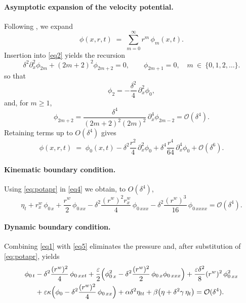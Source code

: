 \documentclass[alpha-refs, 12pt]{wiley-article}
\renewcommand{\O}{\mathcal{O}}
\begin{document}
\paragraph{Asymptotic expansion of the velocity potential.} Following \cite{BCS}, we expand
\begin{equation}\label{eq:potential}
  \phi(x,r,t)\;=\;\sum_{m=0}^{\infty} r^{m}\,\phi_{m}(x,t).
\end{equation}
Insertion into \eqref{eq2} yields the recursion
\begin{equation}\label{eq:recurr}
  \delta^{2}\partial_{x}^{2}\phi_{2m}
  +(2m+2)^{2}\phi_{2m+2}=0,
  \qquad
  \phi_{2m+1}=0,
  \quad m\ \in\ \{0,1,2,\dots\}.
\end{equation}
so that
\begin{equation}\label{eq:phi2}
  \phi_{2}=-\frac{\delta^{2}}{4}\,\partial_{x}^{2}\phi_{0},
\end{equation}
and, for $m\ge1$,
\begin{equation}\label{eq:phim}
  \phi_{2m+2}
  =\frac{\delta^{4}}{(2m+2)^{2}(2m)^{2}}\,
   \partial_{x}^{4}\phi_{2m-2}
  =\O(\delta^{4}).
\end{equation}
Retaining terms up to $O(\delta^{4})$ gives
\begin{equation}\label{eq:potapr}
  \phi(x,r,t)
  \;=\;
  \phi_{0}(x,t)
  -\delta^{2}\frac{r^{2}}{4}\,\partial_{x}^{2}\phi_{0}
  +\delta^{4}\frac{r^{4}}{64}\,\partial_{x}^{4}\phi_{0}
  +\O(\delta^{6}).
\end{equation}

\paragraph{Kinematic boundary condition.} Using \eqref{eq:potapr} in \eqref{eq4} we obtain, to $O(\delta^{4})$,
\begin{equation}\label{eq:massp1}
  \eta_{t}
  +r^{w}_{x}\,\phi_{0\,x}
  +\frac{r^{w}}{2}\,\phi_{0\,xx}
  -\delta^{2}\frac{(r^{w})^{2}r^{w}_{x}}{4}\,\phi_{0\,xxx}
  -\delta^{2}\frac{(r^{w})^{3}}{16}\,\phi_{0\,xxxx}
  =\O(\delta^{4}).
\end{equation}

\paragraph{Dynamic boundary condition.} Combining \eqref{eq1} with \eqref{eq5} eliminates the pressure and, after substitution of \eqref{eq:potapr}, yields
\begin{align}\label{eq:momentump1}
  \phi_{0\,t}
  &-\delta^{2}\frac{(r^{w})^{2}}{4}\,\phi_{0\,xxt}
   +\frac{\varepsilon}{2}\Bigl(
       \phi_{0\,x}^{2}
       -\delta^{2}\frac{(r^{w})^{2}}{2}\,\phi_{0\,x}\phi_{0\,xxx}
   \Bigr)
   +\frac{\varepsilon\delta^{2}}{8}(r^{w})^{2}\,\phi_{0\,xx}^{2}
   \notag\\
  &+\varepsilon\kappa
     \Bigl(\phi_{0}
           -\delta^{2}\frac{(r^{w})^{2}}{4}\,\phi_{0\,xx}\Bigr)
   +\alpha\delta^{2}\eta_{tt}
   +\beta\bigl(\eta+\delta^{2}\gamma\,\eta_{t}\bigr)
   = \O(\delta^{4}).
\end{align}
\end{document}
